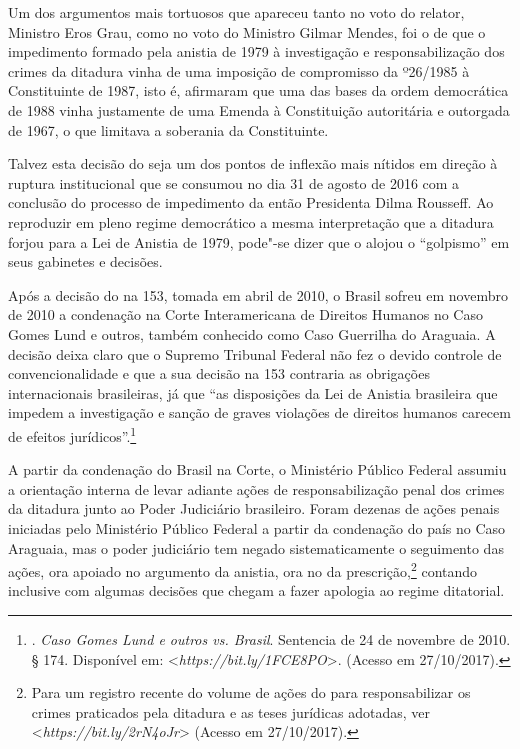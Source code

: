 Um dos argumentos mais tortuosos que apareceu tanto no voto do
relator, Ministro Eros Grau, como no voto do Ministro Gilmar Mendes, foi
o de que o impedimento formado pela anistia de 1979 à investigação e
responsabilização dos crimes da ditadura vinha de uma imposição de
compromisso da  º26/1985 à Constituinte de 1987, isto é, afirmaram
que uma das bases da ordem democrática de 1988 vinha justamente de uma
Emenda à Constituição autoritária e outorgada de 1967, o que limitava a
soberania da Constituinte.

Talvez esta decisão do  seja um dos pontos de inflexão mais nítidos
em direção à ruptura institucional que se consumou no dia 31 de agosto
de 2016 com a conclusão do processo de impedimento da então Presidenta
Dilma Rousseff. Ao reproduzir em pleno regime democrático a mesma
interpretação que a ditadura forjou para a Lei de Anistia de 1979,
pode"-se dizer que o  alojou o ``golpismo'' em seus gabinetes e
decisões.

Após a decisão do  na  153, tomada em abril de 2010, o Brasil
sofreu em novembro de 2010 a condenação na Corte Interamericana de
Direitos Humanos no Caso Gomes Lund e outros, também conhecido como Caso
Guerrilha do Araguaia. A decisão deixa claro que o Supremo Tribunal
Federal não fez o devido controle de convencionalidade e que a sua
decisão na  153 contraria as obrigações internacionais brasileiras,
já que ``as disposições da Lei de Anistia brasileira que impedem a
investigação e sanção de graves violações de direitos humanos carecem de
efeitos jurídicos''.\footnote{.
  \emph{Caso Gomes Lund e outros vs. Brasil}. Sentencia de 24 de
  novembre de 2010. § 174. Disponível em:
  \textless{}\emph{https://bit.ly/1FCE8PO}\textgreater{}.
  (Acesso em 27/10/2017).}

A partir da condenação do Brasil na Corte, o Ministério Público Federal
assumiu a orientação interna de levar adiante ações de responsabilização
penal dos crimes da ditadura junto ao Poder Judiciário brasileiro. Foram
dezenas de ações penais iniciadas pelo Ministério Público Federal a
partir da condenação do país no Caso Araguaia, mas o poder judiciário
tem negado sistematicamente o seguimento das ações, ora apoiado no
argumento da anistia, ora no da prescrição,\footnote{Para um registro
  recente do volume de ações do  para responsabilizar os crimes
  praticados pela ditadura e as teses jurídicas adotadas, ver
  \textless{}\emph{https://bit.ly/2rN4oJr}\textgreater{}
  (Acesso em 27/10/2017).} contando inclusive com algumas decisões que
chegam a fazer apologia ao regime ditatorial.

